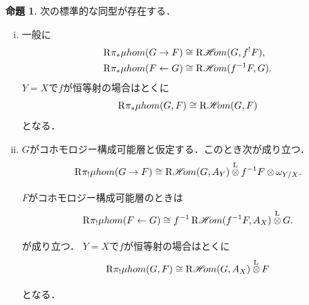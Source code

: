 \documentclass[leqno, 10pt, a4paper, dvipdfmx]{jsarticle}
\theoremstyle{definition}
\numberwithin{equation}{section}
\newcommand{\HOM}{\mathop{\mathscr{H}\hspace{-2pt}om}\nolimits}%
\newcommand{\RHOM}{\mathop{\mathrm{R}\hspace{-1.5pt}\HOM}\nolimits}
\newcommand{\Rder}{\mathrm{R}}
\newcommand{\tens}[1][]{\mathbin{\otimes_{\raise1.5ex\hbox to-.1em{}{#1}}}}
\newcommand{\lltens}[1][]{\mathbin{{\mathop{\tens}\limits^{\mathrm{L}}_{#1}}}}
\theoremstyle{mystyle}
\newtheorem{PRP}[AXM]{命題}
\renewenvironment{leftbar}{%
  \def\FrameCommand{\textcolor{lightgray}{\vrule width 4pt} \hspace{10pt}}%
  \MakeFramed {\advance\hsize-\width \FrameRestore}}%
{\endMakeFramed}
\newcommand{\muhom}{\mu hom}
\begin{document}
\begin{leftbar}
\begin{PRP}
  次の標準的な同型が存在する．
  \begin{enumerate}[(i)]
    \item 一般に
    \begin{align*}
      \Rder{\pi_{\ast}}\muhom(G\to F)&\cong\RHOM(G,f^{!}F),\\
      \Rder{\pi_{\ast}}\muhom(F\leftarrow G)&\cong\RHOM(f^{-1}F,G).
    \end{align*}
    \(Y=X\)で\(f\)が恒等射の場合はとくに\[
      \Rder{\pi_{\ast}}\muhom(G, F)\cong\RHOM(G,F)
    \]
    となる．
    \item \(G\)がコホモロジー構成可能層と仮定する．このとき次が成り立つ．\[
      \Rder{\pi_{!}}\muhom(G\to F)
      \cong
      \RHOM(G,A_Y)\lltens[]f^{-1}F\tens[]\omega_{Y/X}.
    \]
    \(F\)がコホモロジー構成可能層のときは
    \[
      \Rder{\pi_{!}}\muhom(F\leftarrow G)
      \cong
      f^{-1}\RHOM(f^{-1}F,A_X)\lltens[]G.
    \]が成り立つ．
    \(Y=X\)で\(f\)が恒等射の場合はとくに\[
      \Rder{\pi_{!}}\muhom(G, F)\cong\RHOM(G,A_X)\lltens[]F
    \]
    となる．
  \end{enumerate}
\end{PRP}
\end{leftbar}
\end{document}
